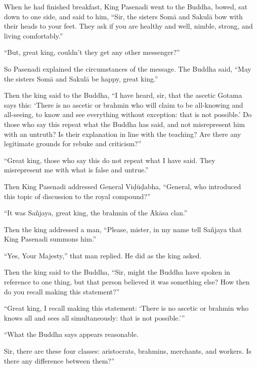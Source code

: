 \documentclass[12pt,openany]{book}%
\begin{document}
When he had finished breakfast, King Pasenadi went to the Buddha, bowed, sat down to one side, and said to him, “Sir, the sisters \textsanskrit{Somā} and \textsanskrit{Sakulā} bow with their heads to your feet. They ask if you are healthy and well, nimble, strong, and living comfortably.” 

“But, great king, couldn’t they get any other messenger?” 

So Pasenadi explained the circumstances of the message. The Buddha said, “May the sisters \textsanskrit{Somā} and \textsanskrit{Sakulā} be happy, great king.” 

Then the king said to the Buddha, “I have heard, sir, that the ascetic Gotama says this: ‘There is no ascetic or brahmin who will claim to be all-knowing and all-seeing, to know and see everything without exception: that is not possible.’ Do those who say this repeat what the Buddha has said, and not misrepresent him with an untruth? Is their explanation in line with the teaching? Are there any legitimate grounds for rebuke and criticism?” 

“Great king, those who say this do not repeat what I have said. They misrepresent me with what is false and untrue.” 

Then King Pasenadi addressed General \textsanskrit{Viḍūḍabha}, “General, who introduced this topic of discussion to the royal compound?” 

“It was \textsanskrit{Sañjaya}, great king, the brahmin of the \textsanskrit{Ākāsa} clan.” 

Then the king addressed a man, “Please, mister, in my name tell \textsanskrit{Sañjaya} that King Pasenadi summons him.” 

“Yes, Your Majesty,” that man replied. He did as the king asked. 

Then the king said to the Buddha, “Sir, might the Buddha have spoken in reference to one thing, but that person believed it was something else? How then do you recall making this statement?” 

“Great king, I recall making this statement: ‘There is no ascetic or brahmin who knows all and sees all simultaneously: that is not possible.’” 

“What the Buddha says appears reasonable. 

Sir, there are these four classes: aristocrats, brahmins, merchants, and workers. Is there any difference between them?” 
\end{document}
